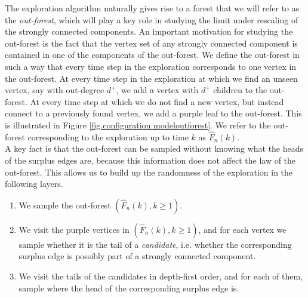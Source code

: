 The exploration algorithm naturally gives rise to a forest that we will refer to as the \emph{out-forest}, which will play a key role in studying the limit under rescaling of the strongly connected components. An important motivation for studying the out-forest is the fact that the vertex set of any strongly connected component is contained in one of the components of the out-forest. We define the out-forest in such a way that every time step in the exploration corresponds to one vertex in the out-forest. At every time step in the exploration at which we find an unseen vertex, say with out-degree $d^+$, we add a vertex with $d^+$ children to the out-forest. At every time step at which we do not find a new vertex, but instead connect to a previously found vertex, we add a purple leaf to the out-forest. This is illustrated in Figure \ref{fig.configuration modeloutforest}. We refer to the out-forest corresponding to the exploration up to time $k$ as $\hat{F}_n(k)$.\\
A key fact is that the out-forest can be sampled without knowing what the heads of the surplus edges are, because this information does not affect the law of the out-forest. This allows us to build up the randomness of the exploration in the following layers.
\begin{enumerate}
    \item We sample the out-forest $(\hat{F}_n(k),k\geq 1)$. 
    \item We visit the purple vertices in $(\hat{F}_n(k),k\geq 1)$, and for each vertex we sample whether it is the tail of a \emph{candidate}, i.e. whether the corresponding surplus edge is possibly part of a strongly connected component.
    \item We visit the tails of the candidates in depth-first order, and for each of them, sample where the head of the corresponding surplus edge is.
\end{enumerate}


